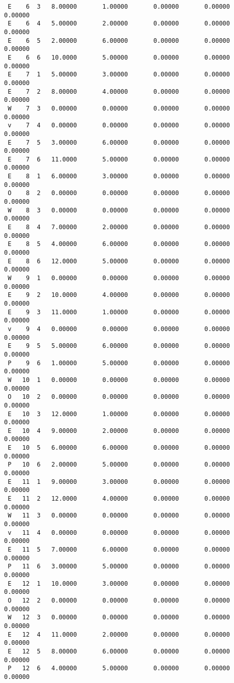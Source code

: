 \begin{verbatim}
 E    6  3   8.00000       1.00000       0.00000       0.00000       0.00000    
 E    6  4   5.00000       2.00000       0.00000       0.00000       0.00000    
 E    6  5   2.00000       6.00000       0.00000       0.00000       0.00000    
 E    6  6   10.0000       5.00000       0.00000       0.00000       0.00000    
 E    7  1   5.00000       3.00000       0.00000       0.00000       0.00000    
 E    7  2   8.00000       4.00000       0.00000       0.00000       0.00000    
 W    7  3   0.00000       0.00000       0.00000       0.00000       0.00000    
 v    7  4   0.00000       0.00000       0.00000       0.00000       0.00000    
 E    7  5   3.00000       6.00000       0.00000       0.00000       0.00000    
 E    7  6   11.0000       5.00000       0.00000       0.00000       0.00000    
 E    8  1   6.00000       3.00000       0.00000       0.00000       0.00000    
 O    8  2   0.00000       0.00000       0.00000       0.00000       0.00000    
 W    8  3   0.00000       0.00000       0.00000       0.00000       0.00000    
 E    8  4   7.00000       2.00000       0.00000       0.00000       0.00000    
 E    8  5   4.00000       6.00000       0.00000       0.00000       0.00000    
 E    8  6   12.0000       5.00000       0.00000       0.00000       0.00000    
 W    9  1   0.00000       0.00000       0.00000       0.00000       0.00000    
 E    9  2   10.0000       4.00000       0.00000       0.00000       0.00000    
 E    9  3   11.0000       1.00000       0.00000       0.00000       0.00000    
 v    9  4   0.00000       0.00000       0.00000       0.00000       0.00000    
 E    9  5   5.00000       6.00000       0.00000       0.00000       0.00000    
 P    9  6   1.00000       5.00000       0.00000       0.00000       0.00000    
 W   10  1   0.00000       0.00000       0.00000       0.00000       0.00000    
 O   10  2   0.00000       0.00000       0.00000       0.00000       0.00000    
 E   10  3   12.0000       1.00000       0.00000       0.00000       0.00000    
 E   10  4   9.00000       2.00000       0.00000       0.00000       0.00000    
 E   10  5   6.00000       6.00000       0.00000       0.00000       0.00000    
 P   10  6   2.00000       5.00000       0.00000       0.00000       0.00000    
 E   11  1   9.00000       3.00000       0.00000       0.00000       0.00000    
 E   11  2   12.0000       4.00000       0.00000       0.00000       0.00000    
 W   11  3   0.00000       0.00000       0.00000       0.00000       0.00000    
 v   11  4   0.00000       0.00000       0.00000       0.00000       0.00000    
 E   11  5   7.00000       6.00000       0.00000       0.00000       0.00000    
 P   11  6   3.00000       5.00000       0.00000       0.00000       0.00000    
 E   12  1   10.0000       3.00000       0.00000       0.00000       0.00000    
 O   12  2   0.00000       0.00000       0.00000       0.00000       0.00000    
 W   12  3   0.00000       0.00000       0.00000       0.00000       0.00000    
 E   12  4   11.0000       2.00000       0.00000       0.00000       0.00000    
 E   12  5   8.00000       6.00000       0.00000       0.00000       0.00000    
 P   12  6   4.00000       5.00000       0.00000       0.00000       0.00000   
\end{verbatim}
\normalsize
 
